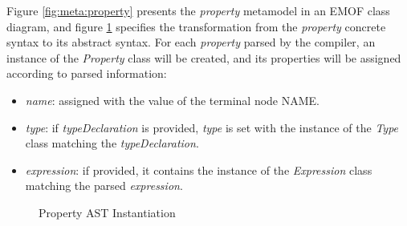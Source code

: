 \begin{abstract-syntax}
Figure \ref{fig:meta:property} presents the \emph{property} metamodel
in an EMOF \cite{mof} class diagram,
and figure \ref{fig:ast:property} specifies
the transformation
from the \emph{property} concrete syntax to its abstract syntax.
For each \emph{property} parsed by the compiler,
an instance of the \emph{Property} class will be created,
and its properties will be assigned
according to parsed information:

\begin{itemize}

\item \emph{name}:
assigned with the value of the terminal node NAME.

\item \emph{type}:
if \emph{typeDeclaration} is provided,
\emph{type} is set with the instance of the \emph{Type} class
matching the \emph{typeDeclaration}.

\item \emph{expression}:
if provided,
it contains the instance of the \emph{Expression} class
matching the parsed \emph{expression}.

\end{itemize}
\end{abstract-syntax}

\begin{figure}
\verbatimfont{\small}

\caption{Property AST Instantiation}
\label{fig:ast:property}
\end{figure}
